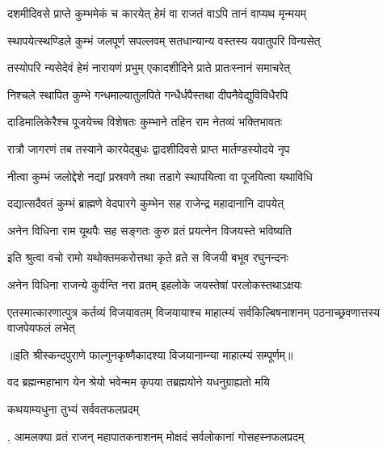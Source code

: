 \twolineshloka
{दशमीदिवसे प्राप्ते कुम्भमेकं च कारयेत्}
{हेमं वा राजतं वाऽपि तानं वाप्यथ मृन्मयम्} %

\twolineshloka
{स्थापयेत्स्थण्डिले कुम्भं जलपूर्ण सपल्लवम्}
{सतधान्यान्य वस्तस्य यवातुपरि विन्यसेत्} %

\twolineshloka
{तस्योपरि न्यसेदेवं हेमं नारायणं प्रभुम्}
{एकादशीदिने प्राते प्रातःस्नानं समाचरेत्} %

\twolineshloka
{निश्चले स्थापित कुम्भे गन्धमाल्यातुलपिते}
{गन्धैर्धपैस्तथा दीपनैवेद्युविविधैरपि} %

\twolineshloka
{दाडिमालिकेरैश्च पूजयेच्च विशेषतः}
{कुम्भाने तहिन राम नेतव्यं भक्तिभावतः} %

\twolineshloka
{रात्रौ जागरणं तब तस्याने कारयेद्बुधः}
{द्वादशीदिवसे प्राप्त मार्तण्डस्योदये नृप} %

\twolineshloka
{नीत्वा कुम्भं जलोद्देशे नद्यां प्रस्रवणे तथा}
{तडागे स्थापयित्वा वा पूजयित्वा यथाविधि} %

\twolineshloka
{दद्यात्सदैवतं कुम्भं ब्राह्मणे वेदपारगे}
{कुम्भेन सह राजेन्द्र महादानानि दापयेत्} %

\twolineshloka
{अनेन विधिना राम यूथपैः सह सङ्गतः}
{कुरु व्रतं प्रयत्नेन विजयस्ते भविष्यति} %

\twolineshloka
{इति श्रुत्वा वचो रामो यथोक्तमकरोत्तथा}
{कृते व्रते स विजयी बभूव रघुनन्दनः} %

\twolineshloka
{अनेन विधिना राजन्ये कुर्वन्ति नरा व्रतम्}
{इहलोके जयस्तेषां परलोकस्तथाऽक्षयः} %


\threelineshloka
{एतस्मात्कारणात्पुत्र कर्तव्यं विजयावतम्}
{विजयायाश्च माहात्म्यं सर्वकिल्बिषनाशनम्}
{पठनाच्छ्रवणात्तस्य वाजपेयफलं लभेत्} %

॥इति श्रीस्कन्दपुराणे फाल्गुनकृष्णैकादश्या विजयानाम्न्या माहात्म्यं सम्पूर्णम्॥


\hyperref[sec:ekadashi_mahatmyam_vrata_raja]{\closesub}
\clearpage

\label{sec:vrata-raja-phalguna-shuklamalaki}


\twolineshloka
{वद ब्रह्मन्महाभाग येन श्रेयो भवेन्मम}
{कृपया तब्रह्मयोने यधनुग्राह्यतो मयि} %



\onelineshloka
{कथयाम्यधुना तुभ्यं सर्ववतफलप्रदम्} %

\twolineshloka
{, आमलक्या व्रतं राजन् महापातकनाशनम्}
{मोक्षदं सर्वलोकानां गोसहस्नफलप्रदम्} %

